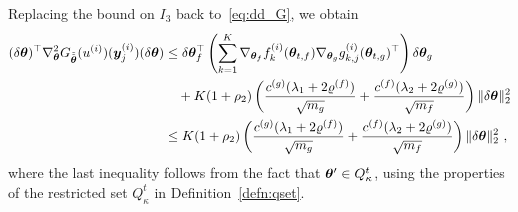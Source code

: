 Replacing the bound on $I_3$ back to~\eqref{eq:dd_G}, we obtain 
\begin{equation}
\label{eq:dd_G1}
\begin{aligned}
    (\delta \vtheta)^\top \nabla_{\vtheta}^2 G_{\tilde{\tilde{\vtheta}}}(u^{(i)})(\vy^{(i)}_j)(\delta\vtheta) 
& \leq \delta \vtheta_f^\top \left( \sum_{k=1}^K \nabla_{\vtheta_f} f_k^{(i)}(\vtheta_{t,f}) \nabla_{\vtheta_g} g_{k,j}^{(i)}(\vtheta_{t,g})^\top \right) \delta \vtheta_g\\
&\quad+ K(1+\rho_2)\left( \frac{c^{(g)} (\lambda_1+2\varrho^{(f)})}{\sqrt{m_g}} + \frac{c^{(f)} (\lambda_2+2\varrho^{(g)})}{\sqrt{m_f}} \right) \| \delta \vtheta \|_2^2\\
&\leq K(1+\rho_2)\left( \frac{c^{(g)} (\lambda_1+2\varrho^{(f)})}{\sqrt{m_g}} + \frac{c^{(f)} (\lambda_2+2\varrho^{(g)})}{\sqrt{m_f}} \right) \| \delta \vtheta \|_2^2~,
%
%
\end{aligned}
\end{equation}
where the last inequality follows from the fact that  ${\bm{\theta}}^{\prime}\in Q^t_{\kappa}$, using the properties of the restricted set $Q^t_{\kappa}$ in Definition~\ref{defn:qset}.

